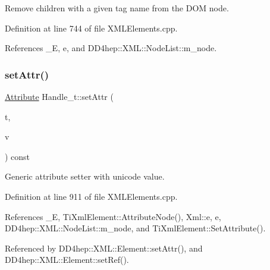 Remove children with a given tag name from the D\+OM node. 



Definition at line 744 of file X\+M\+L\+Elements.\+cpp.



References \+\_\+E, e, and D\+D4hep\+::\+X\+M\+L\+::\+Node\+List\+::m\+\_\+node.

\hypertarget{class_d_d4hep_1_1_x_m_l_1_1_handle__t_a632cbc35565d20727b74d340ea637893}{}\label{class_d_d4hep_1_1_x_m_l_1_1_handle__t_a632cbc35565d20727b74d340ea637893} 
\subsubsection{\texorpdfstring{set\+Attr()}{setAttr()}\hspace{0.1cm}{\footnotesize\ttfamily [1/8]}}
{\footnotesize\ttfamily \hyperlink{namespace_d_d4hep_1_1_x_m_l_a5c19b7116be99d69b4b22d911357baaf}{Attribute} Handle\+\_\+t\+::set\+Attr (\begin{DoxyParamCaption}\item[{const \hyperlink{namespace_d_d4hep_1_1_x_m_l_a09e5d9cc86ed782f6826dfe0778c1815}{Xml\+Char} $\ast$}]{t,  }\item[{const \hyperlink{namespace_d_d4hep_1_1_x_m_l_a09e5d9cc86ed782f6826dfe0778c1815}{Xml\+Char} $\ast$}]{v }\end{DoxyParamCaption}) const}



Generic attribute setter with unicode value. 



Definition at line 911 of file X\+M\+L\+Elements.\+cpp.



References \+\_\+E, Ti\+Xml\+Element\+::\+Attribute\+Node(), Xml\+::e, e, D\+D4hep\+::\+X\+M\+L\+::\+Node\+List\+::m\+\_\+node, and Ti\+Xml\+Element\+::\+Set\+Attribute().



Referenced by D\+D4hep\+::\+X\+M\+L\+::\+Element\+::set\+Attr(), and D\+D4hep\+::\+X\+M\+L\+::\+Element\+::set\+Ref().

\hypertarget{class_d_d4hep_1_1_x_m_l_1_1_handle__t_ad4a21b74eff73c7b4b0d7eb068835ee4}{}\label{class_d_d4hep_1_1_x_m_l_1_1_handle__t_ad4a21b74eff73c7b4b0d7eb068835ee4} 
